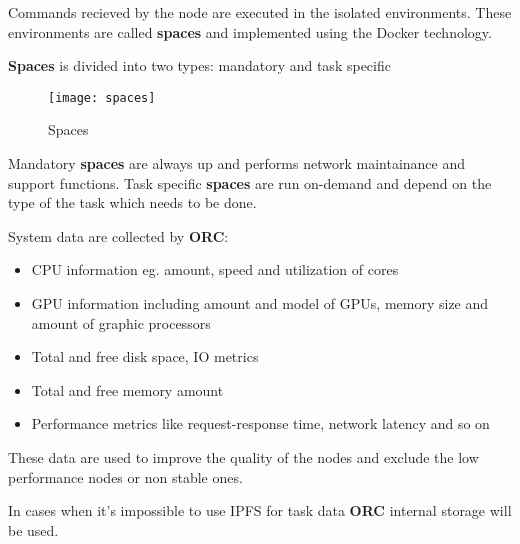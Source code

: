 Commands recieved by the node are executed in the isolated environments.
These environments are called \textbf{spaces} and implemented using the Docker technology.

\newpage

\textbf{Spaces} is divided into two types: mandatory and task specific

\begin{figure}[h]
\centering
\texttt{[image: spaces]}
\caption{Spaces}
\end{figure}

Mandatory \textbf{spaces} are always up and performs network maintainance and support functions.
Task specific \textbf{spaces} are run on-demand and depend on the type of the task which needs to be done.

System data are collected by \textbf{ORC}:

\begin{itemize}
    \item CPU information eg. amount, speed and utilization of cores
    \item GPU information including amount and model of GPUs, memory size and amount of graphic processors
    \item Total and free disk space, IO metrics
    \item Total and free memory amount
    \item Performance metrics like request-response time, network latency and so on
\end{itemize}

These data are used to improve the quality of the nodes and exclude the low performance nodes or non stable ones.

In cases when it's impossible to use IPFS for task data \textbf{ORC} internal storage will be used.
